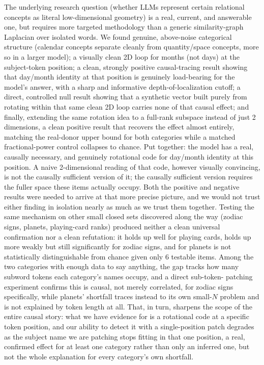 \documentclass[11pt]{article}
\begin{document}
The underlying research question (whether LLMs represent certain relational
concepts as literal low-dimensional geometry) is a real, current, and
answerable one, but requires more targeted methodology than a generic
similarity-graph Laplacian over isolated words. We found genuine, above-noise
categorical structure (calendar concepts separate cleanly from quantity/space
concepts, more so in a larger model); a visually clean 2D loop for months (not
days) at the subject-token position; a clean, strongly positive causal-tracing
result showing that day/month identity at that position is genuinely
load-bearing for the model's answer, with a sharp and informative
depth-of-localization cutoff; a direct, controlled null result showing that a
synthetic vector built purely from rotating within that same clean 2D loop
carries none of that causal effect; and finally, extending the same rotation
idea to a full-rank subspace instead of just 2 dimensions, a clean positive
result that recovers the effect almost entirely, matching the real-donor
upper bound for both categories while a matched fractional-power control
collapses to chance. Put together: the model has a real, causally necessary,
and genuinely rotational code for day/month identity at this position. A
naive 2-dimensional reading of that code, however visually convincing,
is not the causally sufficient version of it; the causally sufficient
version requires the fuller space these items actually occupy. Both the
positive and negative results were needed to arrive at that more precise
picture, and we would not trust either finding in isolation nearly as much as
we trust them together. Testing the same mechanism on other small closed
sets discovered along the way (zodiac signs, planets, playing-card ranks)
produced neither a clean universal confirmation nor a clean refutation: it
holds up well for playing cards, holds up more weakly but still
significantly for zodiac signs, and for planets is not statistically
distinguishable from chance given only 6 testable items. Among the two
categories with enough data to say anything, the gap tracks how many
subword tokens each category's names occupy, and a direct sub-token-
patching experiment confirms this is causal, not merely correlated, for
zodiac signs specifically, while planets' shortfall traces instead to its
own small-$N$ problem and is not explained by token length at all. That,
in turn, sharpens the scope of the entire causal story: what we have
evidence for is a rotational code at a specific token position, and our
ability to detect it with a single-position patch degrades as the subject
name we are patching stops fitting in that one position, a real,
confirmed effect for at least one category rather than only an inferred
one, but not the whole explanation for every category's own shortfall.
\end{document}
